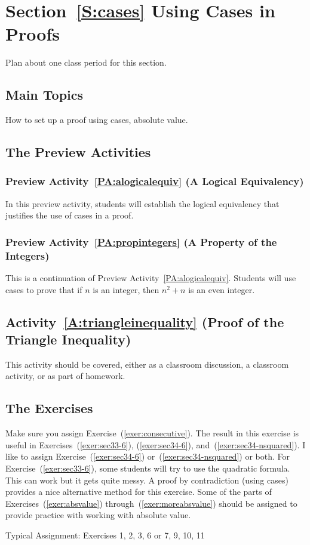\section*{Section~\ref{S:cases} Using Cases in Proofs}
Plan about one class period for this section.  


\subsection*{Main Topics}
How to set up a proof using cases, absolute value.

\subsection*{The Preview Activities}
\subsubsection*{Preview Activity~\ref{PA:alogicalequiv} (A Logical Equivalency)}  
In this preview activity, students will establish the logical equivalency that justifies the use of cases in a proof.

\subsubsection*{Preview Activity~\ref{PA:propintegers} (A Property of the Integers)}
This is a continuation of Preview Activity~\ref{PA:alogicalequiv}.  Students will use cases to prove that if $n$ is an integer, then $n^2 + n$ is an even integer.
\hbreak

\subsection*{Activity~\ref{A:triangleinequality} (Proof of the Triangle Inequality)}
This activity should be covered, either as a classroom discussion, a classroom activity, or as part of homework.
\hbreak

\subsection*{The Exercises}
Make sure you assign Exercise~(\ref{exer:consecutive}).  The result in this exercise is useful in Exercises~(\ref{exer:sec33-6}), (\ref{exer:sec34-6}), and~(\ref{exer:sec34-nsquared}).  I like to assign Exercise~(\ref{exer:sec34-6}) or~(\ref{exer:sec34-nsquared}) or both.    For Exercise~(\ref{exer:sec33-6}), some students will try to use the quadratic formula.  This can work but it gets quite messy.  A proof by contradiction (using cases) provides a nice alternative method for this exercise.  Some of the parts of Exercises~(\ref{exer:absvalue}) through~(\ref{exer:moreabsvalue}) should be assigned to provide practice with working with absolute value.

\vskip6pt
\noindent
Typical Assignment:  Exercises 1, 2, 3, 6 or 7, 9, 10, 11

\hbreak
\endinput
